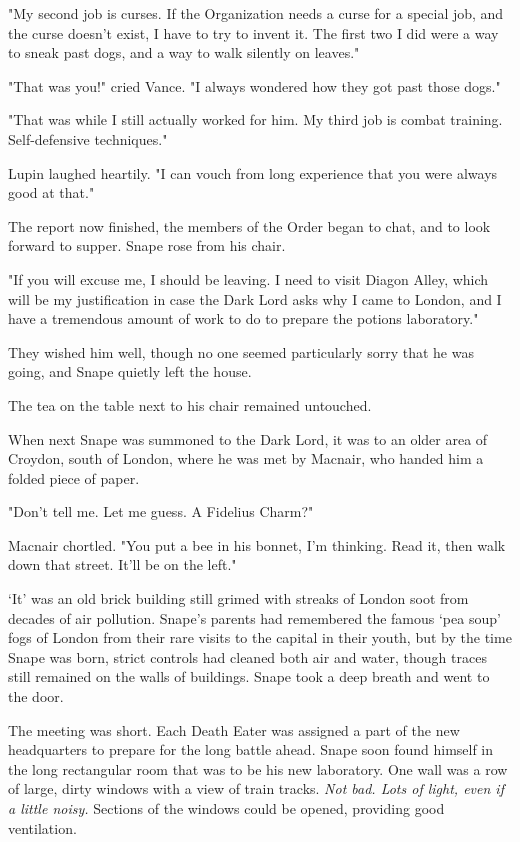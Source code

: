 "My second job is curses. If the Organization needs a curse for a special job, and the curse doesn't exist, I have to try to invent it. The first two I did were a way to sneak past dogs, and a way to walk silently on leaves."

"That was you!" cried Vance. "I always wondered how they got past those dogs."

"That was while I still actually worked for him. My third job is combat training. Self-defensive techniques."

Lupin laughed heartily. "I can vouch from long experience that you were always good at that."

The report now finished, the members of the Order began to chat, and to look forward to supper. Snape rose from his chair.

"If you will excuse me, I should be leaving. I need to visit Diagon Alley, which will be my justification in case the Dark Lord asks why I came to London, and I have a tremendous amount of work to do to prepare the potions laboratory."

They wished him well, though no one seemed particularly sorry that he was going, and Snape quietly left the house.

The tea on the table next to his chair remained untouched.

\sbreak

When next Snape was summoned to the Dark Lord, it was to an older area of Croydon, south of London, where he was met by Macnair, who handed him a folded piece of paper.

"Don't tell me. Let me guess. A Fidelius Charm?"

Macnair chortled. "You put a bee in his bonnet, I'm thinking. Read it, then walk down that street. It'll be on the left."

`It' was an old brick building still grimed with streaks of London soot from decades of air pollution. Snape's parents had remembered the famous `pea soup' fogs of London from their rare visits to the capital in their youth, but by the time Snape was born, strict controls had cleaned both air and water, though traces still remained on the walls of buildings. Snape took a deep breath and went to the door.

The meeting was short. Each Death Eater was assigned a part of the new headquarters to prepare for the long battle ahead. Snape soon found himself in the long rectangular room that was to be his new laboratory. One wall was a row of large, dirty windows with a view of train tracks. \emph{Not bad. Lots of light, even if a little noisy.} Sections of the windows could be opened, providing good ventilation.

